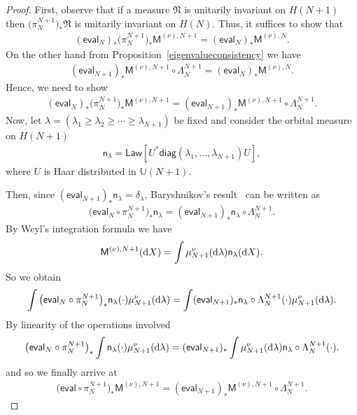 \documentclass[pdftex]{sigma}
\numberwithin{equation}{section}
\begin{document}
\begin{proof}First, observe that if a measure $\mathfrak{N}$ is unitarily invariant on $H(N+1)$ then $\big(\pi_{N}^{N+1}\big)_*\mathfrak{N}$ is unitarily invariant on $H(N)$. Thus, it suffices to show that
\begin{gather*}
 (\mathsf{eval}_N )_*\big(\pi_N^{N+1}\big)_*\mathsf{M}^{(\nu),N+1}= (\mathsf{eval}_N )_*\mathsf{M}^{(\nu),N}.
\end{gather*}
On the other hand from Proposition~\ref{eigenvalueconsistency} we have
\begin{gather*}
\left(\mathsf{eval}_{N+1}\right)_*\mathsf{M}^{(\nu),N+1}\circ \Lambda_N^{N+1}=\left(\mathsf{eval}_N\right)_*\mathsf{M}^{(\nu),N}.
\end{gather*}
Hence, we need to show
\begin{gather*}
 (\mathsf{eval}_N )_*\big(\pi_N^{N+1}\big)_*\mathsf{M}^{(\nu),N+1}= (\mathsf{eval}_{N+1} )_*\mathsf{M}^{(\nu),N+1}\circ \Lambda_N^{N+1}.
\end{gather*}
Now, let $\lambda=(\lambda_1\ge \lambda_2 \ge \cdots \ge \lambda_{N+1})$ be fixed and consider the orbital measure on $H(N+1)${\samepage
\begin{gather*}
\mathsf{n}_{\lambda}=\mathsf{Law} [U^*\mathsf{diag}(\lambda_1,\dots, \lambda_{N+1})U ],
\end{gather*}
where $U$ is Haar distributed in $\mathbb{U}(N+1)$.}

Then, since $ (\mathsf{eval}_{N+1} )_*\mathsf{n}_{\lambda}=\delta_{\lambda}$, Baryshnikov's result~\cite{Baryshnikov} can be written as
\begin{gather*}
\big(\mathsf{eval}_N\circ\pi_N^{N+1}\big)_*\mathsf{n}_{\lambda}= (\mathsf{eval}_{N+1} )_*\mathsf{n}_{\lambda}\circ \Lambda_N^{N+1}.
\end{gather*}
By Weyl's integration formula we have
\begin{gather*}
\mathsf{M}^{(\nu),N+1}({\rm d}X)=\int\mu_{N+1}^{\nu}({\rm d}\lambda)\mathsf{n}_{\lambda}({\rm d}X).
\end{gather*}
So we obtain
\begin{gather*}
\int \big(\mathsf{eval}_N\circ\pi_N^{N+1}\big)_*\mathsf{n}_{\lambda}(\cdot) \mu_{N+1}^{\nu}({\rm d}\lambda)= \int (\mathsf{eval}_{N+1} )_*\mathsf{n}_{\lambda}\circ \Lambda_N^{N+1}(\cdot) \mu_{N+1}^{\nu}({\rm d}\lambda).
\end{gather*}
By linearity of the operations involved
\begin{gather*}
\big(\mathsf{eval}_N\circ\pi_N^{N+1}\big)_*\int \mathsf{n}_{\lambda}(\cdot) \mu_{N+1}^{\nu}({\rm d}\lambda)= (\mathsf{eval}_{N+1} )_*\int \mu_{N+1}^{\nu}({\rm d}\lambda)\mathsf{n}_{\lambda}\circ \Lambda_N^{N+1}(\cdot) .
\end{gather*}
and so we finally arrive at
\begin{gather*}
\big(\mathsf{eval}\circ\pi_N^{N+1}\big)_*\mathsf{M}^{(\nu),N+1}= (\mathsf{eval}_{N+1} )_*\mathsf{M}^{(\nu),N+1}\circ \Lambda_N^{N+1}.\tag*{\qed}
\end{gather*}\renewcommand{\qed}{}
\end{proof}
\end{document}
